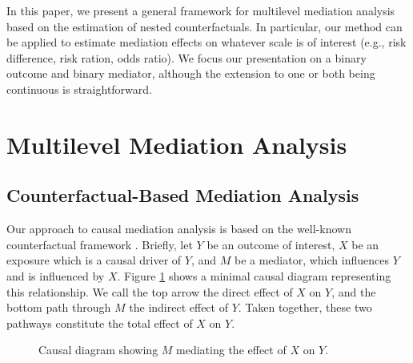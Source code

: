 \documentclass{article}
\begin{document}
In this paper, we present a general framework for multilevel mediation analysis based on the estimation of nested counterfactuals. In particular, our method can be applied to estimate mediation effects on whatever scale is of interest (e.g., risk difference, risk ration, odds ratio). We focus our presentation on a binary outcome and binary mediator, although the extension to one or both being continuous is straightforward.




\section{Multilevel Mediation Analysis}



\subsection{Counterfactual-Based Mediation Analysis}
\label{sec:MA_defns}

Our approach to causal mediation analysis is based on the well-known counterfactual framework \citep[see, e.g.,][]{Van09,Pea12}. Briefly, let $Y$ be an outcome of interest, $X$ be an exposure which is a causal driver of $Y$, and $M$ be a mediator, which influences $Y$ and is influenced by $X$. Figure \ref{fig:simp_med} shows a minimal causal diagram representing this relationship. We call the top arrow the direct effect of $X$ on $Y$, and the bottom path through $M$ the indirect effect of $Y$. Taken together, these two pathways constitute the total effect of $X$ on $Y$.

\begin{figure}
    \centering
      \caption{Causal diagram showing $M$ mediating the effect of $X$ on $Y$.}    
      \label{fig:simp_med}
\end{figure}
\end{document}
